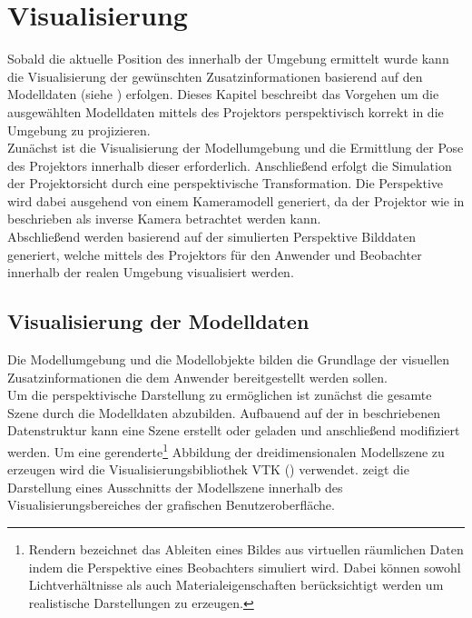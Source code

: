\chapter{Visualisierung}
\label{chap.vis}


Sobald die aktuelle Position des  innerhalb der Umgebung ermittelt wurde kann die Visualisierung der gewünschten Zusatzinformationen basierend auf den Modelldaten (siehe ) erfolgen. Dieses Kapitel beschreibt das Vorgehen um die ausgewählten Modelldaten mittels des Projektors perspektivisch korrekt in die Umgebung zu projizieren.\\
Zunächst ist die Visualisierung der Modellumgebung und die Ermittlung der Pose des Projektors innerhalb dieser erforderlich. Anschließend erfolgt die Simulation der Projektorsicht durch eine perspektivische Transformation. Die Perspektive wird dabei ausgehend von einem Kameramodell generiert, da der Projektor wie in  beschrieben als inverse Kamera betrachtet werden kann.\\
Abschließend werden basierend auf der simulierten Perspektive Bilddaten generiert, welche mittels des Projektors für den Anwender und Beobachter innerhalb der realen Umgebung visualisiert werden.

\section{Visualisierung der Modelldaten}
Die Modellumgebung und die Modellobjekte bilden die Grundlage der visuellen Zusatzinformationen die dem Anwender bereitgestellt werden sollen. \\
Um die perspektivische Darstellung zu ermöglichen ist zunächst die gesamte Szene durch die Modelldaten abzubilden. Aufbauend auf der in  beschriebenen Datenstruktur kann eine Szene erstellt oder geladen und anschließend modifiziert werden. Um eine gerenderte\footnote{Rendern bezeichnet das Ableiten eines Bildes aus virtuellen räumlichen Daten indem die Perspektive eines Beobachters simuliert wird. Dabei können sowohl Lichtverhältnisse als auch Materialeigenschaften berücksichtigt werden um realistische Darstellungen zu erzeugen.} Abbildung der dreidimensionalen Modellszene zu erzeugen wird die Visualisierungsbibliothek VTK () verwendet.  zeigt die Darstellung eines Ausschnitts der Modellszene innerhalb des Visualisierungsbereiches der grafischen Benutzeroberfläche.\\

